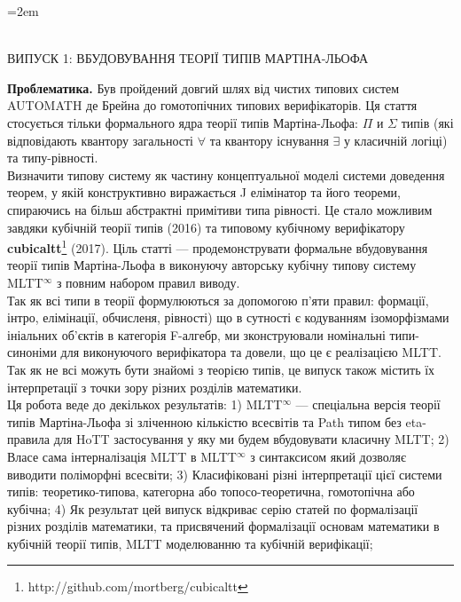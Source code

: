 \documentclass[twocolumn,10pt]{article}
\theoremstyle{definition}
\begin{document}
  \begin{@twocolumnfalse}
   \renewcommand{\bibname}{\fontsize{9pt}{12pt}\selectfont References}
   
   

 \setmainfont{Arial}
\parindent=2em

\fontsize{8pt}{12pt}\selectfont {}\\
\vspace{0.1cm}
\fontsize{9pt}{12pt}\selectfont \indent ВИПУСК 1: ВБУДОВУВАННЯ ТЕОРІЇ ТИПІВ МАРТІНА-ЛЬОФА

{\bf Проблематика.}
Був пройдений довгий шлях від чистих типових систем AUTOMATH де Брейна до
гомотопічних типових верифікаторів. Ця стаття стосується тільки формального ядра
теорії типів Мартіна-Льофа: $\Pi$ и $\Sigma$ типів (які відповідають
квантору загальності $\forall$ та квантору існування $\exists$ у класичній логіці)
та типу-рівності.\\
Визначити типову систему як частину концептуальної моделі системи доведення теорем,
у якій конструктивно виражається J елімінатор та його теореми, спираючись на більш абстрактні
примітиви типа рівності. Це стало можливим завдяки кубічній теорії типів (2016) та типовому кубічному верифікатору
{\bf cubicaltt}\footnote{http://github.com/mortberg/cubicaltt} (2017).
Ціль статті --- продемонструвати формальне вбудовування теорії типів Мартіна-Льофа
в виконуючу авторську кубічну типову систему MLTT$^{\infty}$ з повним набором правил виводу.\\
Так як всі типи в теорії формулюються за допомогою п'яти
правил: формації, інтро, елімінації, обчисленя, рівності) що в сутності
є кодуванням ізоморфізмами ініальних об'єктів в категорія F-алгебр, ми зконструювали
номінальні типи-синоніми для виконуючого верифікатора та довели, що це є реалізацією MLTT.
Так як не всі можуть бути знайомі з теорією типів,
це випуск також містить їх інтерпретації з точки зору різних розділів математики.\\
Ця робота веде до декількох результатів:
1) MLTT$^{\infty}$ --- спеціальна версія теорії типів Мартіна-Льофа зі зліченною кількістю всесвітів та Path типом без eta-правила для HoTT застосування у яку ми будем вбудовувати класичну MLTT;
2) Власе сама інтерналізація MLTT в MLTT$^{\infty}$ з синтаксисом який дозволяє виводити поліморфні всесвіти;
3) Класифіковані різні інтерпретації цієї системи типів: теоретико-типова, категорна або топосо-теоретична, гомотопічна або кубічна;
4) Як результат цей випуск відкриває серію статей по формалізації різних розділів математики,
   та присвячений формалізації основам математики в кубічній теорії типів, MLTT моделюванню та кубічній верифікації;

 \end{@twocolumnfalse}
\end{document}
